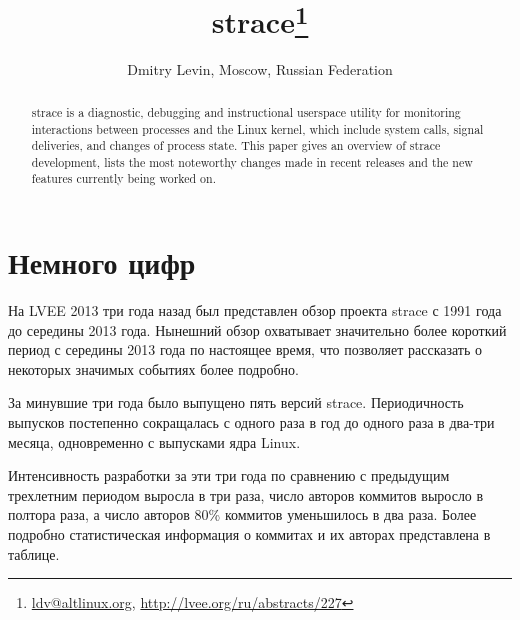 \documentclass[10pt, a5paper]{article}
\begin{document}
\title{strace\footnote{\url{ldv@altlinux.org}, \url{http://lvee.org/ru/abstracts/227}}}
\author{Dmitry Levin, Moscow, Russian Federation}
\maketitle
\begin{abstract}
strace is a diagnostic, debugging and instructional userspace utility for monitoring interactions between processes and the Linux kernel, which include system calls, signal deliveries, and changes of process state. This paper gives an overview of strace development, lists the most noteworthy changes made in recent releases and the new features currently being worked on.
\end{abstract}

\section*{Немного цифр}

На LVEE 2013 три года назад был представлен обзор проекта strace с 1991 года
до середины 2013 года\cite{lvee2013}. Нынешний обзор охватывает значительно более короткий период с середины 2013 года по настоящее время, что позволяет рассказать о некоторых значимых событиях более подробно.

За минувшие три года было выпущено пять версий strace.
Периодичность выпусков постепенно сокращалась с одного раза в год
до одного раза в два-три месяца, одновременно с выпусками ядра Linux.

Интенсивность разработки за эти три года по сравнению с предыдущим
трехлетним периодом выросла в три раза, число авторов коммитов выросло в
полтора раза, а число авторов 80\% коммитов уменьшилось в два раза. Более
подробно статистическая информация о коммитах и их авторах представлена в
таблице.
\end{document}

